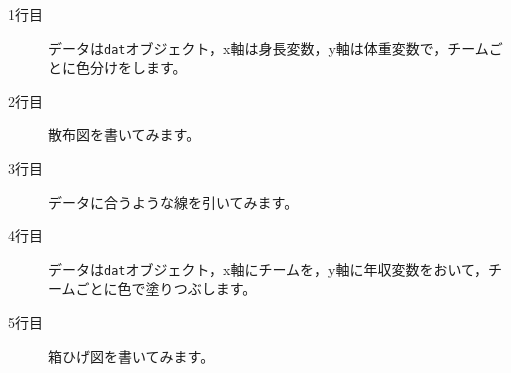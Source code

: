 \begin{description}
	\item[1行目] データは\texttt{dat}オブジェクト，x軸は身長変数，y軸は体重変数で，チームごとに色分けをします。
	\item[2行目] 散布図を書いてみます。
	\item[3行目] データに合うような線を引いてみます。
	\item[4行目] データは\texttt{dat}オブジェクト，x軸にチームを，y軸に年収変数をおいて，チームごとに色で塗りつぶします。
	\item[5行目] 箱ひげ図を書いてみます。
\end{description}
